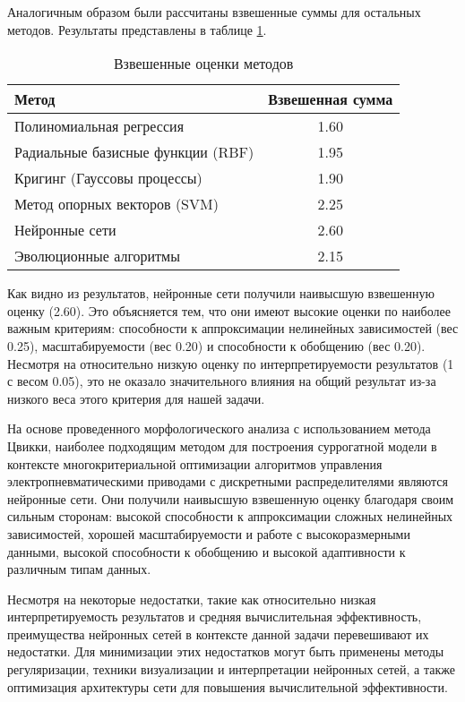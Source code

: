 Аналогичным образом были рассчитаны взвешенные суммы для остальных методов.
Результаты представлены в таблице \ref{tab:weighted_scores}.

\begin{table}[h]
    \centering
    \caption{Взвешенные оценки методов}
    \begin{tabular}{lc}
        \midrule
        Метод                             & Взвешенная сумма \\
        \midrule
        Полиномиальная регрессия          & 1.60             \\
        Радиальные базисные функции (RBF) & 1.95             \\
        Кригинг (Гауссовы процессы)       & 1.90             \\
        Метод опорных векторов (SVM)      & 2.25             \\
        Нейронные сети                    & 2.60             \\
        Эволюционные алгоритмы            & 2.15             \\
        \hline
    \end{tabular}
    \label{tab:weighted_scores}
\end{table}



Как видно из результатов, нейронные сети получили наивысшую взвешенную оценку
(2.60). Это объясняется тем, что они имеют высокие оценки по наиболее важным
критериям: способности к аппроксимации нелинейных зависимостей (вес 0.25),
масштабируемости (вес 0.20) и способности к обобщению (вес 0.20). Несмотря на
относительно низкую оценку по интерпретируемости результатов (1 с весом 0.05),
это не оказало значительного влияния на общий результат из-за низкого веса этого
критерия для нашей задачи.

На основе проведенного морфологического анализа с использованием метода
Цвикки, наиболее подходящим методом для построения суррогатной модели
в контексте многокритериальной оптимизации алгоритмов управления
электропневматическими приводами с дискретными распределителями
являются нейронные сети. Они получили наивысшую взвешенную оценку
благодаря своим сильным сторонам: высокой способности к аппроксимации
сложных нелинейных зависимостей, хорошей масштабируемости и работе с
высокоразмерными данными, высокой способности к обобщению и высокой
адаптивности к различным типам данных.

Несмотря на некоторые недостатки, такие как относительно низкая интерпретируемость
результатов и средняя вычислительная эффективность,
преимущества нейронных сетей в контексте данной задачи перевешивают
их недостатки. Для минимизации этих недостатков могут быть применены методы
регуляризации, техники визуализации и интерпретации нейронных сетей, а
также оптимизация архитектуры сети для повышения вычислительной эффективности.

